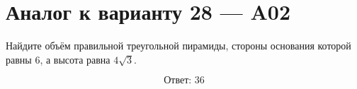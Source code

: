 \documentclass[12pt,a4paper]{article}
\begin{document}
\section*{Аналог к варианту 28 — A02}

Найдите объём правильной треугольной пирамиды, стороны основания которой равны \(6\), а высота равна \(4\sqrt3\).

\begin{center}
\end{center}

\[
\boxed{\text{Ответ: }36}
\]
\end{document}
